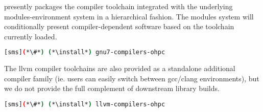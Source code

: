 \OHPC{} presently packages the \GNU{} compiler toolchain integrated with the 
underlying modules-environment system in a hierarchical fashion. The modules
system will conditionally present compiler-dependent software based on the
toolchain currently loaded. 

\begin{lstlisting}[language=bash]
[sms](*\#*) (*\install*) gnu7-compilers-ohpc
\end{lstlisting}

The llvm compiler toolchains are also provided as a standalone additional
compiler family (ie. users can easily switch between gcc/clang environments),
but we do not provide the full complement of downstream library builds.

\begin{lstlisting}[language=bash]
[sms](*\#*) (*\install*) llvm-compilers-ohpc
\end{lstlisting}
